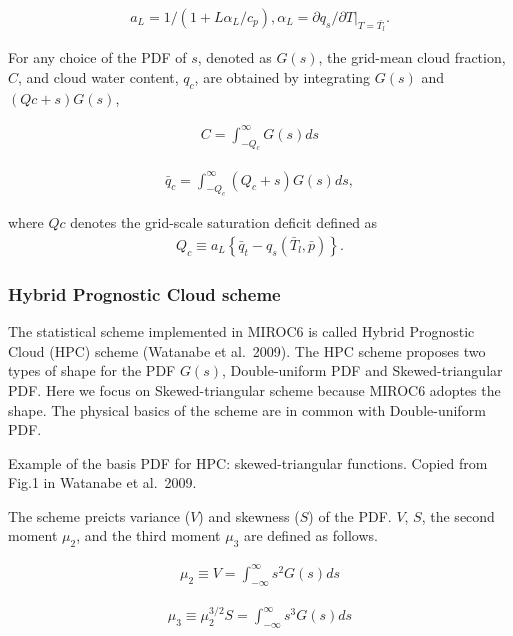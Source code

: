 \begin{eqnarray}
a_{L}=1 /\left(1+L \alpha_{L} / c_{p}\right), \alpha_{L}=\partial q_{s} /\left.\partial T\right|_{T=\bar{T_l}}.
\end{eqnarray}

For any choice of the PDF of \(s\), denoted as \(G(s)\), the grid-mean
cloud fraction, \(C\), and cloud water content, \(q_c\), are obtained by
integrating \(G(s)\) and \((Qc + s)G(s)\),

\begin{eqnarray}
C=\int_{-Q_{c}}^{\infty}G(s)ds
\end{eqnarray}

\begin{eqnarray}
\bar{q}_{c}=\int_{-Q_{c}}^{\infty}\left(Q_{c}+s\right)G(s)ds,
\end{eqnarray}

where \(Qc\) denotes the grid-scale saturation deficit defined as \begin{eqnarray}
Q_{c} \equiv a_{L}\left\{\bar{q}_{t}-q_{s}\left(\bar{T}_{l}, \bar{p}\right)\right\}.
\end{eqnarray}

\hypertarget{hybrid-prognostic-cloud-scheme}{%
\subsubsection{Hybrid Prognostic Cloud
scheme}\label{hybrid-prognostic-cloud-scheme}}

The statistical scheme implemented in MIROC6 is called Hybrid Prognostic
Cloud (HPC) scheme (Watanabe et al.~2009). The HPC scheme proposes two
types of shape for the PDF \(G(s)\), Double-uniform PDF and
Skewed-triangular PDF. Here we focus on Skewed-triangular scheme because
MIROC6 adoptes the shape. The physical basics of the scheme are in
common with Double-uniform PDF.

Example of the basis PDF for HPC: skewed-triangular functions. Copied
from Fig.1 in Watanabe et al.~2009.

The scheme preicts variance (\(V\)) and skewness (\(S\)) of the PDF.
\(V\), \(S\), the second moment \(\mu_2\), and the third moment
\(\mu_3\) are defined as follows.

\begin{eqnarray}
\mu_{2} \equiv V=\int_{-\infty}^{\infty} s^{2} G(s) ds
\end{eqnarray}

\begin{eqnarray}
\mu_{3} \equiv \mu_{2}^{3 / 2} S=\int_{-\infty}^{\infty} s^{3} G(s) d s
\end{eqnarray}

